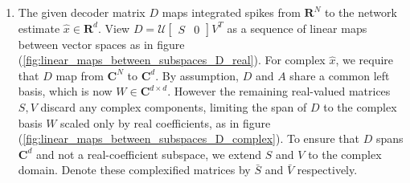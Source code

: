 \begin{enumerate}
\item The given decoder matrix  $D$ maps integrated spikes from $\mathbf{R}^N$ to the network estimate $\hat{x} \in \mathbf{R}^d$. View $D = \mathcal{U} \begin{bmatrix}S & 0 \end{bmatrix} V^T$ as a sequence of linear maps between vector spaces as in figure (\ref{fig:linear_maps_between_subspaces_D_real}). For complex $\hat{x}$, we require that $D$ map from $\mathbf{C}^N$ to $\mathbf{C}^d$. By assumption, $D$ and $A$ share a common left basis, which is now $W \in \mathbf{C}^{d \times d}$. However the remaining real-valued matrices $S, V$ discard any complex components, limiting the span of $D$ to the complex basis $W$ scaled only by real coefficients, as in figure (\ref{fig:linear_maps_between_subspaces_D_complex}). To ensure that $D$ spans $\mathbf{C}^d$ and not a real-coefficient subspace, we extend $S$ and $V$ to the complex domain. Denote these complexified matrices by $\bar{S}$ and $\bar{V}$ respectively. 


\end{enumerate}

